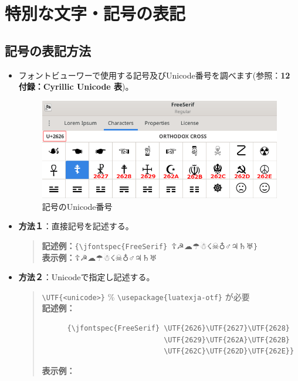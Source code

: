 \documentclass[a4paper,10pt]{ltjsarticle}
\def\fs#1{\fontsize{#1}{#1}\selectfont }
\begin{document}
\section{特別な文字・記号の表記}

\subsection{記号の表記方法}\vspace{-2mm}

\begin{itemize}
  \item フォントビューワーで使用する記号及びUnicode番号を調べます(参照：\textbf{12 付録：Cyrillic Unicode 表})。\\[-14pt] 
\begin{figure}[H]
\centering
\includegraphics[width=12cm]{./images/unicode.png}  
\caption{記号のUnicode番号} 
\end{figure}
\vspace{-6mm}
  \item[] \textbf{方法１}：直接記号を記述する。\\[-12pt]
\begin{quote}
  \textbf{記述例：}\verb+{\jfontspec{FreeSerif} +{\fs{12}☦☭☁☂☃☇☠♁♂♃♄♅}\verb+}+\\
  \textbf{表示例：}{\fs{14}☦☭☁☂☃☇☠♁♂♃♄♅}\\[-10pt]
  \end{quote}

  \item[] \textbf{方法２}：Unicodeで指定し記述する。\\[-12pt]
\begin{quote}
\verb+\UTF{<unicode>}+ \% \verb+\usepackage{luatexja-otf}+ が必要\\
\textbf{記述例：}\vspace{-11.2mm}\\
\begin{verbatim}
      {\jfontspec{FreeSerif} \UTF{2626}\UTF{2627}\UTF{2628}
                             \UTF{2629}\UTF{262A}\UTF{262B}
                             \UTF{262C}\UTF{262D}\UTF{262E}}
\end{verbatim} 
  \textbf{表示例：}{\fs{14}
      }
\end{quote}
  

\end{itemize}
\end{document}
